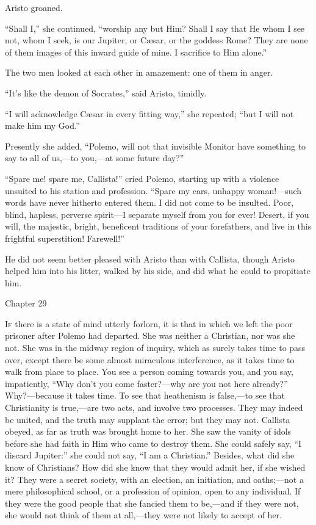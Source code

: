 Aristo groaned.

``Shall I,'' she continued, ``worship any but Him?
Shall I say that He whom I see not, whom I seek, is our Jupiter, or
Cæsar, or the goddess Rome? They are none of them images of this
inward guide of mine. I sacrifice to Him alone.''

The two men looked at each other in amazement: one of them in
anger.

``It's like the demon of Socrates,'' said Aristo, timidly.

``I will acknowledge Cæsar in every fitting way,'' she
repeated; ``but I will not make him my God.''

Presently she added, ``Polemo, will not that invisible Monitor
have something to say to all of us,—to you,—at some future
day?''

``Spare me! spare me, Callista!'' cried Polemo, starting up
with a violence unsuited to his station and profession. ``Spare my
ears, unhappy woman!—such words have never hitherto entered them. I
did not come to be insulted. Poor, blind, hapless, perverse spirit—I
separate myself from you for ever! Desert, if you will, the majestic,
bright, beneficent traditions of your forefathers, and live in this
frightful superstition! Farewell!''

He did not seem better pleased with Aristo than with Callista,
though Aristo helped him into his litter, walked by his side, and did
what he could to propitiate him.

Chapter 29


I\textsc{f} there is a state of mind utterly forlorn, it is that in
which we left the poor prisoner after Polemo had departed. She was
neither a Christian, nor was she not. She was in the midway region of
inquiry, which as surely takes time to pass over, except there be some
almost miraculous interference, as it takes time to walk from place to
place. You see a person coming towards you, and you say, impatiently,
``Why don't you come faster?—why are you not here already?''
Why?—because it takes time. To see that heathenism is false,—to
see that Christianity is true,—are two acts, and involve two
processes. They may indeed be united, and the truth may supplant the
error; but they may not. Callista obeyed, as far as truth was brought
home to her. She saw the vanity of idols before she had faith in Him
who came to destroy them. She could safely say, ``I discard
Jupiter:'' she could not say, ``I am a Christian.''
Besides, what did she know of Christians? How did she know that they
would admit her, if she wished it? They were a secret society, with an
election, an initiation, and oaths;—not a mere philosophical school, or a profession of opinion, open to any individual. If they
were the good people that she fancied them to be,—and if they were
not, she would not think of them at all,—they were not likely to
accept of her.

